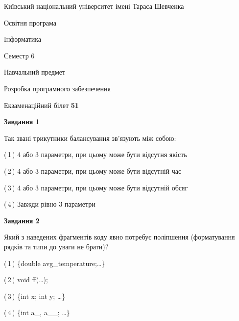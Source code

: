 \documentclass[10pt, ukrainian]{article}
\begin{document}
{{\begin {small}\par
{ \center  Київський національний університет імені Тараса Шевченка \par}
{\parbox {5 cm}{Освітня програма \hfill}{\parbox {7 cm}{Інформатика \hfill}}\parbox {6 cm}{\hfill Семестр 6}}\par
{\parbox {5 cm} {Навчальний предмет \hfill}\parbox {7 cm}{Розробка програмного забезпечення \hfill}\parbox {6cm}{\hfill}\par}\vspace{-7pt} \end{small}}{\center Екзаменаційний білет \No \textbf
{ 51 }\par}}
{
\begin {large}
{\begin {center}\textbf{Завдання 1}\end {center}}\par
Так звані трикутники балансування зв'язують між собою:\par
\vspace{2mm}



(\,1\,) 4 або 3 параметри, при цьому може бути відсутня якість%



(\,2\,) 4 або 3 параметри, при цьому може бути відсутній час%



(\,3\,) 4 або 3 параметри, при цьому може бути відсутній обсяг %



(\,4\,) Завжди рівно 3 параметри%


{\begin {center}\textbf{Завдання 2}\end {center}}\par
Який з наведених фрагментів коду явно потребує поліпшення (форматування рядків та типи до уваги не брати)?\par
\vspace{2mm}



(\,1\,) \{double avg\_temperature;…\} %



(\,2\,) void ff(…);%



(\,3\,) \{int x; int y; …\}%



(\,4\,) \{int a\_, a\_\_; …\}%



\end{large}}
\end{document}
